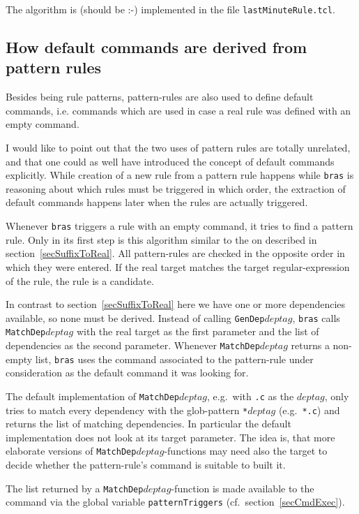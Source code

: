 \documentclass[12pt]{article}
\newcommand{\bras}{\texttt{bras}}
\begin{document}
The algorithm is (should be :-) implemented in the file
\texttt{lastMinuteRule.tcl}.

\subsection{How default commands are derived from pattern rules}
\label{secSuffixAsDefCmd}
Besides being rule patterns, pattern-rules are also used to define
default commands, i.e. commands which are used in case a real rule was
defined with an empty command.

I would like to point out that the two uses of pattern rules are
totally unrelated, and that one could as well have introduced the
concept of default commands explicitly. While creation of a new rule
from a pattern rule happens while \bras{} is reasoning about which rules
must be triggered in which order, the extraction of default commands
happens later when the rules are actually triggered. 

Whenever \bras{} triggers a rule with an empty command, it tries to
find a pattern rule. Only in its first step is this algorithm similar
to the on described in section~\ref{secSuffixToReal}. All
pattern-rules are checked in the opposite order in which they were
entered. If the real target matches the target regular-expression of
the rule, the rule is a candidate.

In contrast to section~\ref{secSuffixToReal} here we have one or more
dependencies available, so none must be derived. Instead of calling
\texttt{GenDep$deptag$}, \bras{} calls \texttt{MatchDep$deptag$} with
the real target as the first parameter and the list of dependencies as
the second parameter. Whenever \texttt{MatchDep$deptag$} returns a
non-empty list, \bras{} uses the command associated to the
pattern-rule under consideration as the default command it was looking
for. 

The default implementation of \texttt{MatchDep$deptag$}, e.g.\ with
\texttt{.c} as the $deptag$, only tries to match every dependency with
the glob-pattern \texttt{*$deptag$} (e.g.\ \texttt{*.c}) and returns
the list of matching dependencies. In particular the default
implementation does not look at its target parameter. The idea is,
that more elaborate versions of \texttt{MatchDep$deptag$}-functions
may need also the target to decide whether the pattern-rule's command
is suitable to built it.

The list returned by a \texttt{MatchDep$deptag$}-function is made
available to the command via the global variable
\texttt{patternTriggers} (cf.\ section~\ref{secCmdExec}).
\end{document}
